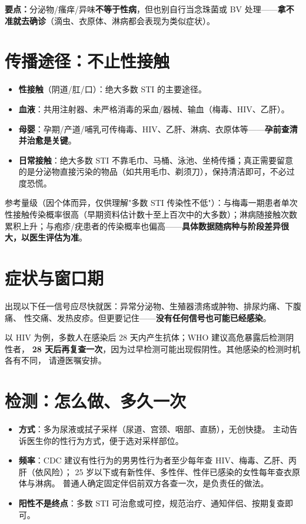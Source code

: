 \documentclass[12pt,UTF8,openany]{ctexbook}
\begin{document}
\noindent\textbf{要点：}分泌物/瘙痒/异味\textbf{不等于性病}，但也别自行当念珠菌或 BV 处理——\textbf{拿不准就去确诊}（滴虫、衣原体、淋病都会表现为类似症状）。

\section{传播途径：不止性接触}

\begin{itemize}[leftmargin=2em,itemsep=0.3em]
  \item \textbf{性接触}（阴道/肛/口）：绝大多数 STI 的主要途径。
  \item \textbf{血液}：共用注射器、未严格消毒的采血/器械、输血（梅毒、HIV、乙肝）。
  \item \textbf{母婴}：孕期/产道/哺乳可传梅毒、HIV、乙肝、淋病、衣原体等——\textbf{孕前查清并治愈是关键}。
  \item \textbf{日常接触}：绝大多数 STI 不靠毛巾、马桶、泳池、坐椅传播；真正需要留意的是分泌物直接污染的物品（如共用毛巾、剃须刀），保持清洁即可，不必过度恐慌。
\end{itemize}

\noindent 参考量级（因个体而异，仅供理解"多数 STI 传染性不低"）：与梅毒一期患者单次性接触传染概率很高（早期资料估计数十至上百次中的大多数）；淋病随接触次数累积上升；与疱疹/疣患者的传染概率也偏高——\textbf{具体数据随病种与阶段差异很大，以医生评估为准}。

\section{症状与窗口期}

出现以下任一信号应尽快就医：异常分泌物、生殖器溃疡或肿物、排尿灼痛、下腹痛、
性交痛、发热皮疹。但更要记住——\textbf{没有任何信号也可能已经感染}。

以 HIV 为例，多数人在感染后 28 天内产生抗体；WHO 建议高危暴露后检测阴性者，
\textbf{28 天后再复查一次}，因为过早检测可能出现假阴性。其他感染的检测时机各有不同，
请遵医嘱安排。

\section{检测：怎么做、多久一次}

\begin{itemize}[leftmargin=2em]
  \item \textbf{方式}：多为尿液或拭子采样（尿道、宫颈、咽部、直肠），无创快捷。
        主动告诉医生你的性行为方式，便于选对采样部位。
  \item \textbf{频率}：CDC 建议有性行为的男男性行为者至少每年查 HIV、梅毒、乙肝、丙肝（依风险）；
        25 岁以下或有新性伴、多性伴、性伴已感染的女性每年查衣原体与淋病。
        普通人确定固定伴侣前双方各查一次，是负责任的做法。
  \item \textbf{阳性不是终点}：多数 STI 可治愈或可控，规范治疗、通知伴侣、按期复查即可。
\end{itemize}
\end{document}
